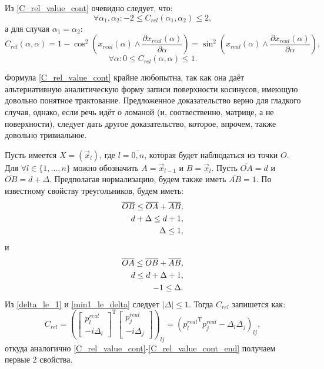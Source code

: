 Из \ref{C_rel_value_cont} очевидно следует, что:
\begin{equation}
	\forall{\alpha_1, \alpha_2}: -2 \le C_{rel}(\alpha_1, \alpha_2) \le 2,
\end{equation}
а для случая $\alpha_1 = \alpha_2$:
\begin{equation}
	C_{rel}(\alpha, \alpha) = 1 - \cos^2\left(x_{real}(\alpha) \wedge \frac{\partial x_{real}(\alpha)}{\partial \alpha}\right) = \sin^2\left(x_{real}(\alpha) \wedge \frac{\partial x_{real}(\alpha)}{\partial \alpha}\right),
\end{equation}
\begin{equation}
	\forall{\alpha}: 0 \le C_{rel}(\alpha, \alpha) \le 1.
	\label{C_rel_value_cont_end}
\end{equation}

Формула \ref{C_rel_value_cont} крайне любопытна, так как она даёт альтернативную аналитическую форму записи поверхности косинусов, имеющую довольно понятное трактование.
Предложенное доказательство верно для гладкого случая, однако, если речь идёт о ломаной (и, соотвественно, матрице, а не поверхности), следует дать другое доказательство, которое, впрочем, также довольно тривиальное.

Пусть имеется $X = (\vec{x}_l)$, где $l = \overline{0,n}$, которая будет наблюдаться из точки $O$. Для $\forall{l} \in \{1, ..., n\}$ можно обозначить $A = \vec{x}_{l-1}$ и $B = \vec{x}_{l}$.
Пусть $\overline{OA} = d$ и $\overline{OB} = d + \Delta$. Предполагая нормализацию, будем также иметь $\overline{AB} = 1$. По известному свойству треугольников, будем иметь:
\begin{align}
	\overline{OB} \le \overline{OA} + \overline{AB}, \notag \\
	d + \Delta \le d + 1, \notag \\
	\Delta \le 1,
	\label{delta_le_1}
\end{align}
и
\begin{align}
	\overline{OA} \le \overline{OB} + \overline{AB}, \notag \\
	d \le d + \Delta + 1, \notag \\
	-1 \le \Delta.
	\label{min1_le_delta}
\end{align}
Из \ref{delta_le_1} и \ref{min1_le_delta} следует $|\Delta| \le 1$. Тогда $C_{rel}$ запишется как:
\begin{equation}
	C_{rel} = {\left({\begin{bmatrix} p^{real}_l \\ -i\Delta_l \end{bmatrix}}^\mathrm{T}\begin{bmatrix} p^{real}_j \\ -i\Delta_j \end{bmatrix}\right)}_{lj} = {({p^{real}_l}^\mathrm{T}p^{real}_j - \Delta_l\Delta_j)}_{lj},
\end{equation}
откуда аналогично \ref{C_rel_value_cont}-\ref{C_rel_value_cont_end} получаем первые 2 свойства.

